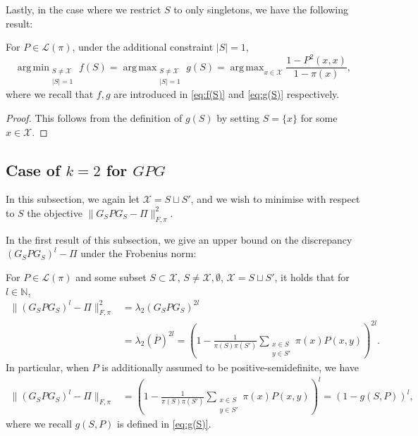 \documentclass[EJP]{ejpecp} %
\DeclareMathOperator*{\argmin}{arg\,min}
\DeclareMathOperator*{\argmax}{arg\,max}
\begin{document}
Lastly, in the case where we restrict $S$ to only singletons, we have the following result:

\begin{proposition}\label{prop:|S|=1GP}
    For $P \in \mathcal{L}(\pi)$, under the additional constraint $|S| = 1$, 
    $$\argmin_{\substack{S \neq \mathcal{X}\\ |S| = 1}} f(S) = \argmax_{\substack{S \neq \mathcal{X}\\ |S| = 1}} g(S) = \argmax_{x \in \mathcal{X}} \frac{1-P^2(x,x)}{1-\pi(x)},$$
    where we recall that $f, g$ are introduced in \eqref{eq:f(S)} and \eqref{eq:g(S)} respectively.
\end{proposition}

\begin{proof}
    This follows from the definition of $g(S)$ by setting $S = \{x\}$ for some $x \in \mathcal{X}$.
\end{proof}

\subsection{Case of $k=2$ for $GPG$} \label{sec:GPG_k=2}
In this subsection, we again let $\mathcal{X} = S \sqcup S'$, and we wish to minimise with respect to $S$ the objective $\|G_S PG_S - \Pi\|_{F, \pi}^2$. 

In the first result of this subsection, we give an upper bound on the discrepancy $(G_SPG_S)^l - \Pi$ under the Frobenius norm:
\begin{proposition}\label{prop:GSPGSlPi}
    For $P \in \mathcal{L}(\pi)$ and some subset $S \subset \mathcal{X}$, $S \neq \mathcal{X}, \emptyset$, $\mathcal{X} = S \sqcup S'$, it holds that for $l \in \mathbb{N}$,
    \begin{align*}
        \|(G_SPG_S)^l - \Pi\|_{F, \pi}^2 &= \lambda_2(G_SPG_S)^{2l} \\
        &= \lambda_2(\overline{P})^{2l} 
        = \left(1 - \frac{1}{\pi(S)\pi(S')}\sum_{\substack{x \in S\\ y \in S'}}  \pi(x)P(x,y) \right)^{2l}.
    \end{align*}
    In particular, when $P$ is additionally assumed to be positive-semidefinite, we have
    \begin{align*}
        \|(G_SPG_S)^l - \Pi\|_{F, \pi} &= \left(1 - \frac{1}{\pi(S)\pi(S')}\sum_{\substack{x \in S\\ y \in S'}}  \pi(x)P(x,y) \right)^{l} = \left(1-g(S,P)\right)^l,
    \end{align*}
    where we recall $g(S,P)$ is defined in \eqref{eq:g(S)}.
\end{proposition}
\end{document}

